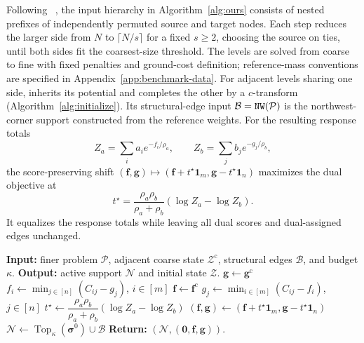 Following \hello~\citep{xia2026dual}, the input hierarchy in Algorithm~\ref{alg:ours} consists of nested prefixes of independently permuted source and target nodes.
Each step reduces the larger side from $N$ to $\lceil N/s\rceil$ for a fixed $s\geq2$, choosing the source on ties, until both sides fit the coarsest-size threshold.
The levels are solved from coarse to fine with fixed penalties and ground-cost definition; reference-mass conventions are specified in Appendix~\ref{app:benchmark-data}.
For adjacent levels sharing one side, \init inherits its potential and completes the other by a $c$-transform (Algorithm~\ref{alg:initialize}).
Its structural-edge input $\mathcal B=\texttt{NW}(\mathcal P)$ is the northwest-corner support constructed from the reference weights.
For the resulting response totals
\begin{equation*}
Z_a=\sum_i a_i e^{-f_i/\rho_a},\qquad Z_b=\sum_j b_j e^{-g_j/\rho_b},
\end{equation*}
the score-preserving shift $(\mathbf f,\mathbf g)\mapsto(\mathbf f+t^\star\mathbf1_m,\mathbf g-t^\star\mathbf1_n)$ maximizes the dual objective at~\citep[Proposition~2]{sejourne2022faster}
\begin{equation}
\label{eq:potential-translation}
t^\star=\frac{\rho_a\rho_b}{\rho_a+\rho_b}(\log Z_a-\log Z_b).
\end{equation}
It equalizes the response totals while leaving all dual scores and dual-assigned edges unchanged.

\begin{algorithm}[t]
\caption{\init: finer-level initialization}
\label{alg:initialize}
\begin{algorithmic}[1]
\STATE \textbf{Input:} finer problem $\mathcal P$, adjacent coarse state $\mathcal Z^{\mathrm c}$, structural edges $\mathcal B$, and budget $\kappa$.
\STATE \textbf{Output:} active support $\mathcal N$ and initial state $\mathcal Z$.
    \STATE $\mathbf g\gets\mathbf g^{\mathrm c}$
    \STATE $f_i\gets\min_{j\in[n]}(C_{ij}-g_j)$, $i\in[m]$
\ELSE
    \STATE $\mathbf f\gets\mathbf f^{\mathrm c}$
    \STATE $g_j\gets\min_{i\in[m]}(C_{ij}-f_i)$, $j\in[n]$
\ENDIF
\STATE $t^\star\gets\dfrac{\rho_a\rho_b}{\rho_a+\rho_b}(\log Z_a-\log Z_b)$
\STATE $(\mathbf f,\mathbf g)\gets(\mathbf f+t^\star\mathbf1_m,\mathbf g-t^\star\mathbf1_n)$
\STATE $\mathcal N\gets\operatorname{Top}_{\kappa}(\boldsymbol\sigma^0)\cup\mathcal B$
\STATE \textbf{Return:} $(\mathcal N,(\mathbf0,\mathbf f,\mathbf g))$.
\end{algorithmic}
\end{algorithm}

